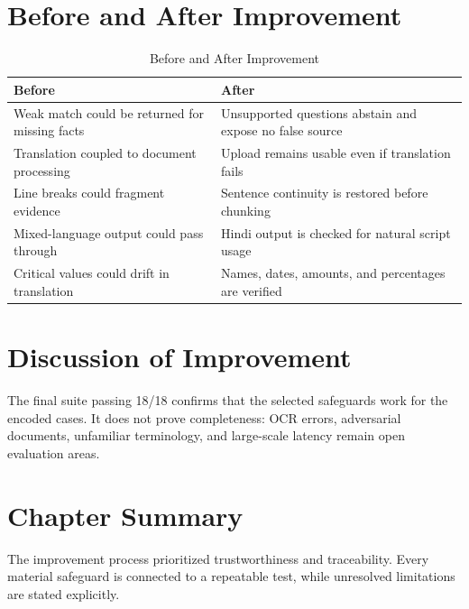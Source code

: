\section{Before and After Improvement}
\begin{table}[H]
\centering
\caption{Before and After Improvement}
\begin{tabular}{|p{5.8cm}|p{7.2cm}|}
\hline
\textbf{Before} & \textbf{After} \\
\hline
Weak match could be returned for missing facts & Unsupported questions abstain and expose no false source \\
\hline
Translation coupled to document processing & Upload remains usable even if translation fails \\
\hline
Line breaks could fragment evidence & Sentence continuity is restored before chunking \\
\hline
Mixed-language output could pass through & Hindi output is checked for natural script usage \\
\hline
Critical values could drift in translation & Names, dates, amounts, and percentages are verified \\
\hline
\end{tabular}
\end{table}

\section{Discussion of Improvement}
The final suite passing 18/18 confirms that the selected safeguards work for the encoded cases. It does not prove completeness: OCR errors, adversarial documents, unfamiliar terminology, and large-scale latency remain open evaluation areas.

\section*{Chapter Summary}
The improvement process prioritized trustworthiness and traceability. Every material safeguard is connected to a repeatable test, while unresolved limitations are stated explicitly.
